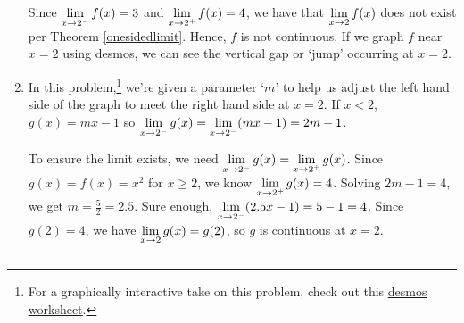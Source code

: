 \documentclass{ximera}
\begin{document}
\begin{ex}
\begin{enumerate}
\medskip

Since $\ds{\lim_{x \rightarrow 2^{-}} f(x) = 3}$ and $\ds{\lim_{x \rightarrow 2^{+}} f(x) = 4}$, we have that $\ds{\lim_{x \rightarrow 2} f(x)}$ does not exist per Theorem \ref{onesidedlimit}.  Hence, $f$ is not continuous.  If we graph $f$ near $x=2$ using desmos, we can see the vertical gap or `jump' occurring at $x = 2$.  

\medskip

\item In this problem,\footnote{For a graphically interactive take on this problem, check out this \href{https://www.desmos.com/calculator/ibtrzesg4i}{\underline{desmos worksheet}}.}  we're given a parameter `$m$' to help us adjust the left hand side of the graph to meet the right hand side at $x = 2$.  If $x<2$, $g(x) = mx-1$ so $\ds{\lim_{x \rightarrow 2^{-}} g(x) = \lim_{x \rightarrow 2^{-}} (mx-1) = 2m-1}$. 

\medskip

To ensure the limit exists, we need  $\ds{\lim_{x \rightarrow 2^{-}} g(x) = \lim_{x \rightarrow 2^{+}} g(x)}$.  Since $g(x) = f(x) = x^2$ for $x \geq 2$, we know $\ds{ \lim_{x \rightarrow 2^{+}} g(x) = 4}$.  Solving  $2m-1 = 4$, we get $m = \frac{5}{2} = 2.5$.  Sure enough, $\ds{\lim_{x \rightarrow 2^{-}} (2.5x-1) = 5 - 1 = 4}$.  Since $g(2) = 4$, we have $\ds{\lim_{x \rightarrow 2} g(x) = g(2)}$, so $g$ is continuous at $x = 2$. 

\begin{center}

\begin{tabular}{cc}


\end{tabular}
\end{center}
\end{enumerate}
\end{ex}
\end{document}
